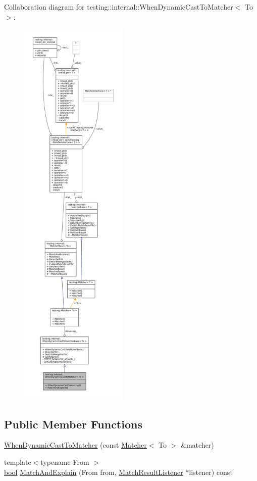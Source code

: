 Collaboration diagram for testing\+:\+:internal\+:\+:When\+Dynamic\+Cast\+To\+Matcher$<$ To $>$\+:
\nopagebreak
\begin{figure}[H]
\begin{center}
\leavevmode
\includegraphics[height=550pt]{classtesting_1_1internal_1_1WhenDynamicCastToMatcher__coll__graph}
\end{center}
\end{figure}
\subsection*{Public Member Functions}
\begin{DoxyCompactItemize}
\item 
\hyperlink{classtesting_1_1internal_1_1WhenDynamicCastToMatcher_a44e444d218197f8180c5ac7fca135f9a}{When\+Dynamic\+Cast\+To\+Matcher} (const \hyperlink{classtesting_1_1Matcher}{Matcher}$<$ To $>$ \&matcher)
\item 
{\footnotesize template$<$typename From $>$ }\\\hyperlink{classbool}{bool} \hyperlink{classtesting_1_1internal_1_1WhenDynamicCastToMatcher_a270f6a1e6ad7c9b69fdefca27c513bf5}{Match\+And\+Explain} (From from, \hyperlink{classtesting_1_1MatchResultListener}{Match\+Result\+Listener} $\ast$listener) const
\end{DoxyCompactItemize}
